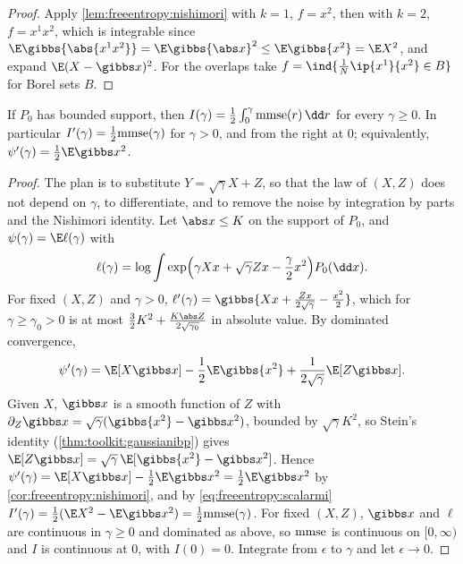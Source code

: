 \begin{refsection}
\begin{proof}
Apply \cref{lem:freeentropy:nishimori} with $k=1$, $f=x^2$, then with $k=2$, $f=x^1x^2$, which is integrable since $\E\gibbs{\abs{x^1x^2}}=\E\gibbs{\abs x}^2\le\E\gibbs{x^2}=\E X^2$, and expand $\E(X-\gibbs x)^2$. For the overlaps take $f=\ind\{\frac1N\ip{x^1}{x^2}\in B\}$ for Borel sets $B$.
\end{proof}

\begin{theorem}[I-MMSE]\label{thm:freeentropy:immse}
If $P_0$ has bounded support, then $I(\gamma)=\frac12\int_0^\gamma\freeentropymmse(r)\,\dd r$ for every $\gamma\ge0$. In particular $I'(\gamma)=\frac12\mathrm{mmse}(\gamma)$ for $\gamma>0$, and from the right at $0$; equivalently, $\psi'(\gamma)=\frac12\E\gibbs x^2$.
\end{theorem}

\begin{proof}
The plan is to substitute $Y=\sqrt\gamma X+Z$, so that the law of $(X,Z)$ does not depend on $\gamma$, to differentiate, and to remove the noise by integration by parts and the Nishimori identity. Let $\abs x\le K$ on the support of $P_0$, and $\psi(\gamma)=\E\ell(\gamma)$ with
\[
\ell(\gamma)=\log\int\exp\Bigl(\gamma Xx+\sqrt\gamma Zx-\frac\gamma2x^2\Bigr)P_0(\dd x).
\]
For fixed $(X,Z)$ and $\gamma>0$, $\ell'(\gamma)=\gibbs{Xx+\frac{Zx}{2\sqrt\gamma}-\frac{x^2}2}$, which for $\gamma\ge\gamma_0>0$ is at most $\frac32K^2+\frac{K\abs Z}{2\sqrt{\gamma_0}}$ in absolute value. By dominated convergence,
\[
\psi'(\gamma)=\E[X\gibbs x]-\frac12\E\gibbs{x^2}+\frac1{2\sqrt\gamma}\E[Z\gibbs x].
\]
Given $X$, $\gibbs x$ is a smooth function of $Z$ with $\partial_Z\gibbs x=\sqrt\gamma(\gibbs{x^2}-\gibbs x^2)$, bounded by $\sqrt\gamma K^2$, so Stein's identity (\cref{thm:toolkit:gaussianibp}) gives $\E[Z\gibbs x]=\sqrt\gamma\,\E[\gibbs{x^2}-\gibbs x^2]$. Hence $\psi'(\gamma)=\E[X\gibbs x]-\frac12\E\gibbs x^2=\frac12\E\gibbs x^2$ by \cref{cor:freeentropy:nishimori}, and by \eqref{eq:freeentropy:scalarmi} $I'(\gamma)=\frac12(\E X^2-\E\gibbs x^2)=\frac12\freeentropymmse(\gamma)$. For fixed $(X,Z)$, $\gibbs x$ and $\ell$ are continuous in $\gamma\ge0$ and dominated as above, so $\mathrm{mmse}$ is continuous on $[0,\infty)$ and $I$ is continuous at $0$, with $I(0)=0$. Integrate from $\epsilon$ to $\gamma$ and let $\epsilon\to0$.
\end{proof}


\end{refsection}

